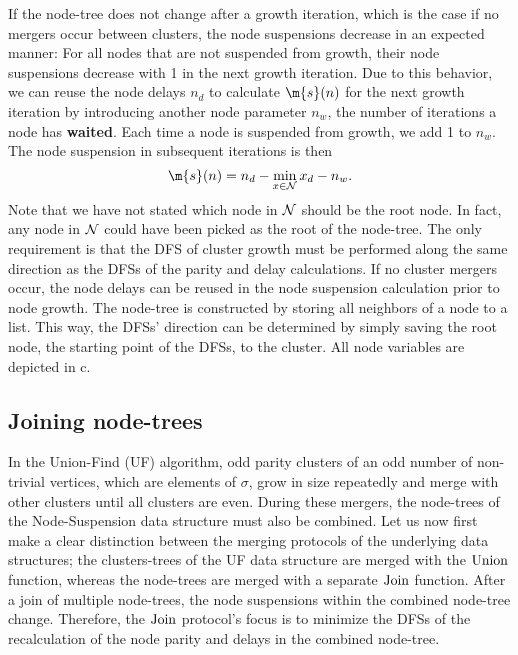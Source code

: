 If the node-tree does not change after a growth iteration, which is the case if no mergers occur between clusters, the node suspensions decrease in an expected manner: For all nodes that are not suspended from growth, their node suspensions decrease with 1 in the next growth iteration. Due to this behavior, we can reuse the node delays $n_d$ to calculate $\m{s}(n)$ for the next growth iteration by introducing another node parameter $n_w$, the number of iterations a node has \textbf{waited}. Each time a node is suspended from growth, we add 1 to $n_w$. The node suspension in subsequent iterations is then
\begin{equation}\label{eq:suspension}
    \m{s}(n) = n_d - \min_{x \in \nset}{x_d} - n_w. 
\end{equation}
Note that we have not stated which node in $\mathcal{N}$ should be the root node. In fact, any node in $\mathcal{N}$ could have been picked as the root of the node-tree. The only requirement is that the DFS of cluster growth must be performed along the same direction as the DFSs of the parity and delay calculations. If no cluster mergers occur, the node delays can be reused in the node suspension calculation prior to node growth. The node-tree is constructed by storing all neighbors of a node to a list. This way, the DFSs' direction can be determined by simply saving the root node, the starting point of the DFSs, to the cluster. All node variables are depicted in c. 


\subsection{Joining node-trees}\label{sec:nodejoin}

In the Union-Find (UF) algorithm, odd parity clusters of an odd number of non-trivial vertices, which are elements of $\sigma$, grow in size repeatedly and merge with other clusters until all clusters are even. During these mergers, the node-trees of the Node-Suspension data structure must also be combined. Let us now first make a clear distinction between the merging protocols of the underlying data structures; the clusters-trees of the UF data structure are merged with the $\operatorname{Union}$ function, whereas the node-trees are merged with a separate $\operatorname{Join}$ function. After a join of multiple node-trees, the node suspensions within the combined node-tree change. Therefore, the $\operatorname{Join}$ protocol's focus is to minimize the DFSs of the recalculation of the node parity and delays in the combined node-tree. 


